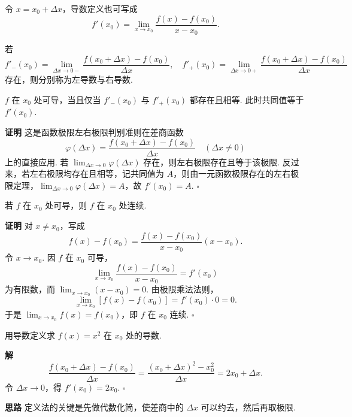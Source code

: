 \documentclass[fontset=fandol]{ctexart}
\newenvironment{proofdetail}{\par\noindent\textbf{证明}\quad}{\hfill$\square$\par\vspace{0.8em}}
\newenvironment{solution}{\par\noindent\textbf{解}\quad}{\hfill$\square$\par\vspace{0.8em}}
\newenvironment{idea}{\par\noindent\textbf{思路}\quad}{\par\vspace{0.4em}}
\begin{document}
令 $x=x_0+\Delta x$，导数定义也可写成
\[
f'(x_0)=\lim_{x\to x_0}\frac{f(x)-f(x_0)}{x-x_0}.
\]

\begin{definition}[左导数与右导数]
若
\[
f'_-(x_0)=\lim_{\Delta x\to0-}\frac{f(x_0+\Delta x)-f(x_0)}{\Delta x},\quad
f'_+(x_0)=\lim_{\Delta x\to0+}\frac{f(x_0+\Delta x)-f(x_0)}{\Delta x}
\]
存在，则分别称为左导数与右导数.
\end{definition}

\begin{proposition}[可导的充要条件]
$f$ 在 $x_0$ 处可导，当且仅当 $f'_-(x_0)$ 与 $f'_+(x_0)$ 都存在且相等. 此时共同值等于 $f'(x_0)$.
\end{proposition}
\begin{proofdetail}
这是函数极限左右极限判别准则在差商函数
\[
\varphi(\Delta x)=\frac{f(x_0+\Delta x)-f(x_0)}{\Delta x}\quad(\Delta x\neq0)
\]
上的直接应用. 若 $\lim_{\Delta x\to0}\varphi(\Delta x)$ 存在，则左右极限存在且等于该极限. 反过来，若左右极限均存在且相等，记共同值为 $A$，则由一元函数极限存在的左右极限定理，$\lim_{\Delta x\to0}\varphi(\Delta x)=A$，故 $f'(x_0)=A$.
\end{proofdetail}

\begin{theorem}[可导必连续]
若 $f$ 在 $x_0$ 处可导，则 $f$ 在 $x_0$ 处连续.
\end{theorem}
\begin{proofdetail}
对 $x\neq x_0$，写成
\[
f(x)-f(x_0)=\frac{f(x)-f(x_0)}{x-x_0}(x-x_0).
\]
令 $x\to x_0$. 因 $f$ 在 $x_0$ 可导，
\[
\lim_{x\to x_0}\frac{f(x)-f(x_0)}{x-x_0}=f'(x_0)
\]
为有限数，而 $\lim_{x\to x_0}(x-x_0)=0$. 由极限乘法法则，
\[
\lim_{x\to x_0}[f(x)-f(x_0)]=f'(x_0)\cdot0=0.
\]
于是 $\lim_{x\to x_0}f(x)=f(x_0)$，即 $f$ 在 $x_0$ 连续.
\end{proofdetail}

\begin{example}[用定义求导]
用导数定义求 $f(x)=x^2$ 在 $x_0$ 处的导数.
\end{example}
\begin{solution}
\[
\frac{f(x_0+\Delta x)-f(x_0)}{\Delta x}
=\frac{(x_0+\Delta x)^2-x_0^2}{\Delta x}
=2x_0+\Delta x.
\]
令 $\Delta x\to0$，得 $f'(x_0)=2x_0$.
\end{solution}
\begin{idea}
定义法的关键是先做代数化简，使差商中的 $\Delta x$ 可以约去，然后再取极限.
\end{idea}
\end{document}
